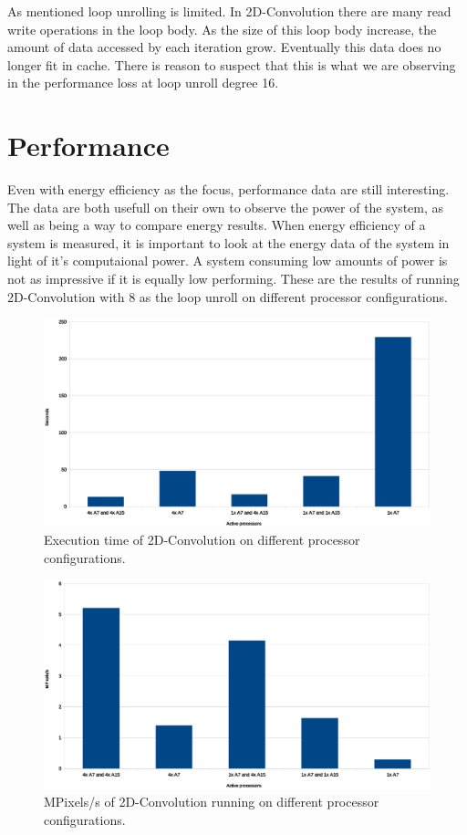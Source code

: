 As mentioned loop unrolling is limited.
In 2D-Convolution there are many read write operations in the loop body.
As the size of this loop body increase, the amount of data accessed by each iteration grow.
Eventually this data does no longer fit in cache.
There is reason to suspect that this is what we are observing in the performance loss at loop unroll degree 16.

\section{Performance}
Even with energy efficiency as the focus, performance data are still interesting.
The data are both usefull on their own to observe the power of the system, as well as being a way to compare energy results.
When energy efficiency of a system is measured, it is important to look at the energy data of the system in light of it's computaional power.
A system consuming low amounts of power is not as impressive if it is equally low performing.
These are the results of running 2D-Convolution with 8 as the loop unroll on different processor configurations.

\begin{figure}[H]
  \centering
  \includegraphics[width=160mm]{fig/execution-time-configurations.eps}
  \caption{Execution time of 2D-Convolution on different processor configurations. \label{overflow}}
\end{figure}

\begin{figure}[H]
  \centering
  \includegraphics[width=160mm]{fig/mpixelss-configurations.eps}
  \caption{MPixels/s of 2D-Convolution running on different processor configurations. \label{overflow}}
\end{figure}

